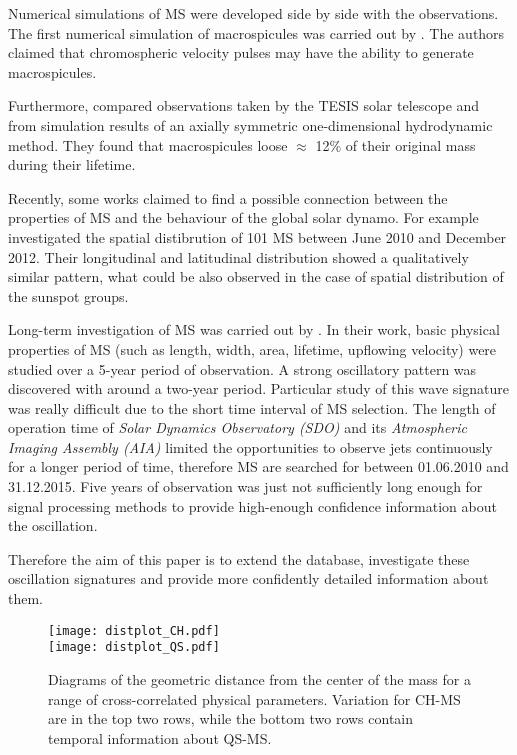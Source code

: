 \documentclass[final,authoryear,5p]{elsarticle}
\begin{document}
Numerical simulations of MS were developed side by side with the observations. The first numerical simulation of macrospicules was carried out by \cite{murawski2011}. The authors claimed that chromospheric velocity pulses may have the ability to generate macrospicules.

Furthermore, \cite{loboda2017} compared observations taken by the TESIS solar telescope and from simulation results of an axially symmetric one-dimensional hydrodynamic method. They found that macrospicules loose $\approx$ 12\% of their original mass during their lifetime. 
 
Recently, some works claimed to find a possible connection between the properties of MS and the behaviour of the global solar dynamo. For example \cite{gyenge2015} investigated the spatial distibrution of 101 MS between June 2010 and December 2012. 
Their longitudinal and latitudinal distribution showed a qualitatively similar pattern, what could be also observed in the case of spatial distribution of the sunspot groups.

Long-term investigation of MS was carried out by \cite{kiss2017}. In their work, basic physical properties of MS (such as length, width, area, lifetime, upflowing velocity) were studied over a 5-year period of observation. A strong oscillatory pattern was discovered with around a two-year period. Particular study of this wave signature was really difficult due to the short time interval of MS selection. The length of operation time of \textit{Solar Dynamics Observatory (SDO)} \citep{pesnell2012} and its \textit{Atmospheric Imaging Assembly (AIA)} \citep{lemen2012} limited the opportunities to observe jets continuously for a longer period of time, therefore MS are searched for between 01.06.2010 and 31.12.2015. Five years of observation was just not sufficiently long enough for signal processing methods to provide high-enough confidence information about the oscillation.

Therefore the aim of this paper is to extend the database, investigate these oscillation signatures and provide more confidently  detailed information about them.
\begin{figure*}[t]
	\texttt{[image: distplot\_CH.pdf]}\\
	\texttt{[image: distplot\_QS.pdf]}
	\centering
	\caption{Diagrams of the geometric distance from the center of the mass for a range of cross-correlated physical parameters. Variation for CH-MS are in the top two rows, while the bottom two rows contain temporal information about QS-MS.}
	\label{fig01}
\end{figure*}
\end{document}
